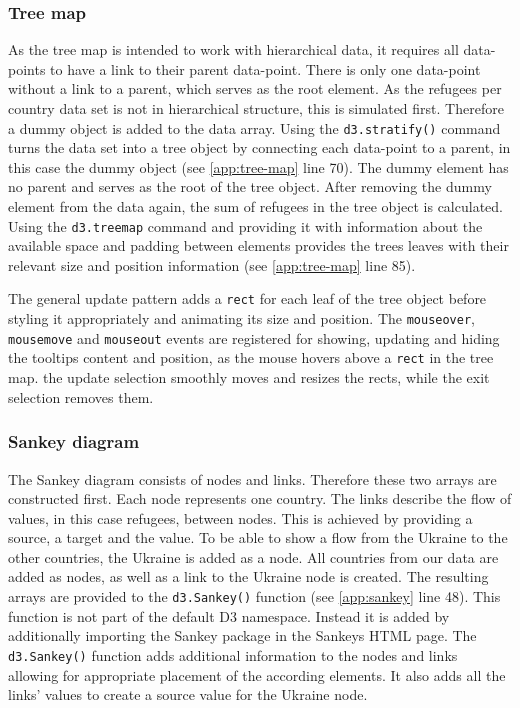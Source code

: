 \subsubsection{Tree map}
As the tree map is intended to work with hierarchical data, it requires all data-points to have a link to their parent data-point. There is only one data-point without a link to a parent, which serves as the root element. As the refugees per country data set is not in hierarchical structure, this is simulated first. Therefore a dummy object is added to the data array. Using the \texttt{d3.stratify()} command turns the data set into a tree object by connecting each data-point to a parent, in this case the dummy object (see \ref{app:tree-map} line 70). The dummy element has no parent and serves as the root of the tree object. After removing the dummy element from the data again, the sum of refugees in the tree object is calculated. Using the \texttt{d3.treemap} command and providing it with information about the available space and padding between elements provides the trees leaves with their relevant size and position information (see \ref{app:tree-map} line 85).

The general update pattern adds a \texttt{rect} for each leaf of the tree object before styling it appropriately and animating its size and position. The \texttt{mouseover}, \texttt{mousemove} and \texttt{mouseout} events are registered for showing, updating and hiding the tooltips content and position, as the mouse hovers above a \texttt{rect} in the tree map. the update selection smoothly moves and resizes the rects, while the exit selection removes them.


\subsubsection{Sankey diagram}
The Sankey diagram consists of nodes and links. Therefore these two arrays are constructed first. Each node represents one country. The links describe the flow of values, in this case refugees, between nodes. This is achieved by providing a source, a target and the value. To be able to show a flow from the Ukraine to the other countries, the Ukraine is added as a node. All countries from our data are added as nodes, as well as a link to the Ukraine node is created. The resulting arrays are provided to the \texttt{d3.Sankey()} function (see \ref{app:sankey} line 48). This function is not part of the default D3 namespace. Instead it is added by additionally importing the Sankey package in the Sankeys HTML page. The \texttt{d3.Sankey()} function adds additional information to the nodes and links allowing for appropriate placement of the according elements. It also adds all the links' values to create a source value for the Ukraine node.

